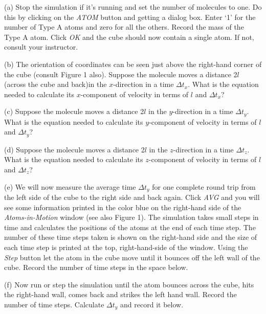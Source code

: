 (a) Stop the simulation if it's running and set the number of molecules to 
one. Do this by clicking on the {\it ATOM} button and getting a dialog box.
Enter `1' for the
number of Type A atoms and zero for all the others. Record the mass of the
Type A atom. Click {\it OK} and
the cube should now contain a single atom. If not, consult your instructor.
\vspace{20mm}

(b) The orientation of coordinates can be seen just above the right-hand corner
of the cube (consult Figure 1 also).
Suppose the molecule moves a distance 2$l$ (across the cube and back)in the $x$-direction in
a time \( \Delta t_{x} \). What is the equation needed to calculate
its $x$-component of velocity in terms of $l$ and \( \Delta t_{x} \)?
\vspace{20mm}

(c) Suppose the molecule moves a distance 2$l$ in the $y$-direction in
a time \( \Delta t_{y} \). What is the equation needed to calculate
its $y$-component of velocity in terms of $l$ and \( \Delta t_{y} \)?
\vspace{20mm}

(d) Suppose the molecule moves a distance 2$l$ in the $z$-direction in
a time \( \Delta t_{z} \). What is the equation needed to calculate
its $z$-component of velocity in terms of $l$ and \( \Delta t_{z} \)?
\vspace{20mm}

(e) We will now measure the average time $\Delta t_y$ for one complete round trip
from the left side of the cube to the right side and back again.
Click {\it AVG} and you will see some information printed in the color blue
on the right-hand side of the {\it Atoms-in-Motion} window (see also Figure 1).
The simulation takes small steps in time and calculates the positions of the
atoms at the end of each time step.
The number of these time steps taken is shown on the right-hand side and the size 
of each time step is printed at the top, right-hand-side of the window.
Using the {\it Step} button let the atom in the cube move until it bounces off the 
left wall of the cube.
Record the number of time steps in the space below.
\vspace{20mm}

(f) Now run or step the simulation until the atom bounces across the cube, hits the right-hand 
wall, comes back and strikes the left hand wall.
Record the number of time steps.
Calculate $\Delta t_y$ and record it below.
\vspace{20mm}


